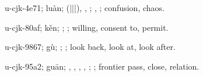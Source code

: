 \begin{multicols}{2}
{\cjkgGlue{}u-cjk-4e71; luàn; \cjkgGlue{}\cjkgGlue{}(\cjkgGlue{}|\cjkgGlue{}|\cjkgGlue{}|\cjkgGlue{}), \cjkgGlue{}\cjkgGlue{}\cjkgGlue{}, \cjkgGlue{}\cjkgGlue{}\cjkgGlue{}; \cjkgGlue{}, \cjkgGlue{}; confusion, chaos.

\cjkgGlue{}u-cjk-80af; kěn; \cjkgGlue{}\cjkgGlue{}\cjkgGlue{}; \cjkgGlue{}; willing, consent to, permit.

\cjkgGlue{}u-cjk-9867; gù; \cjkgGlue{}\cjkgGlue{}\cjkgGlue{}; \cjkgGlue{}; look back, look at, look after.

\cjkgGlue{}u-cjk-95a2; guān; \cjkgGlue{}, \cjkgGlue{}, \cjkgGlue{}\cjkgGlue{}\cjkgGlue{}, \cjkgGlue{}, \cjkgGlue{}; \cjkgGlue{}; frontier pass, close, relation.

}
\end{multicols}
